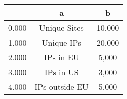 
\begin{tabular}{lcc}
  \toprule
  \toprule
   & a & b\\
  \midrule
  0.000 & Unique Sites & 10,000 \\
  1.000 & Unique IPs & 20,000 \\
  2.000 & IPs in EU & 5,000 \\
  3.000 & IPs in US & 3,000 \\
  4.000 & IPs outside EU & 5,000 \\
  \bottomrule
\end{tabular}
